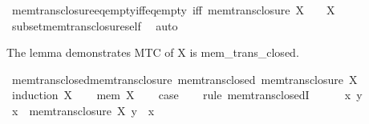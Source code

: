\begin{isabellebody}
\endisatagproof
{\isafoldproof}%
%
\isadelimproof
\isanewline
%
\endisadelimproof
\isanewline
{}\isamarkupfalse%
\ mem{\isacharunderscore}{\kern0pt}trans{\isacharunderscore}{\kern0pt}closure{\isacharunderscore}{\kern0pt}eq{\isacharunderscore}{\kern0pt}empty{\isacharunderscore}{\kern0pt}iff{\isacharunderscore}{\kern0pt}eq{\isacharunderscore}{\kern0pt}empty\ {\isacharbrackleft}{\kern0pt}iff{\isacharbrackright}{\kern0pt}{\isacharcolon}{\kern0pt}\ {\isachardoublequoteopen}mem{\isacharunderscore}{\kern0pt}trans{\isacharunderscore}{\kern0pt}closure\ X\ {\isacharequal}{\kern0pt}\ {\isacharbraceleft}{\kern0pt}{\isacharbraceright}{\kern0pt}\ {\isasymlongleftrightarrow}\ X\ {\isacharequal}{\kern0pt}\ {\isacharbraceleft}{\kern0pt}{\isacharbraceright}{\kern0pt}{\isachardoublequoteclose}\isanewline
%
\isadelimproof
\ \ %
\endisadelimproof
%
\isatagproof
{}\isamarkupfalse%
\ subset{\isacharunderscore}{\kern0pt}mem{\isacharunderscore}{\kern0pt}trans{\isacharunderscore}{\kern0pt}closure{\isacharunderscore}{\kern0pt}self\ \isamarkupfalse%
\ auto%
\endisatagproof
{\isafoldproof}%
%
\isadelimproof
%
\endisadelimproof
%
\begin{isamarkuptext}%
The lemma demonstrates MTC of X is mem\_trans\_closed.%
\end{isamarkuptext}\isamarkuptrue%
\isamarkupfalse%
\ mem{\isacharunderscore}{\kern0pt}trans{\isacharunderscore}{\kern0pt}closed{\isacharunderscore}{\kern0pt}mem{\isacharunderscore}{\kern0pt}trans{\isacharunderscore}{\kern0pt}closure{\isacharcolon}{\kern0pt}\ {\isachardoublequoteopen}mem{\isacharunderscore}{\kern0pt}trans{\isacharunderscore}{\kern0pt}closed\ {\isacharparenleft}{\kern0pt}mem{\isacharunderscore}{\kern0pt}trans{\isacharunderscore}{\kern0pt}closure\ X{\isacharparenright}{\kern0pt}{\isachardoublequoteclose}\isanewline
%
\isadelimproof
%
\endisadelimproof
%
\isatagproof
{}\isamarkupfalse%
\ {\isacharparenleft}{\kern0pt}induction\ X{\isacharparenright}{\kern0pt}\isanewline
\ \ \isamarkupfalse%
\ {\isacharparenleft}{\kern0pt}mem\ X{\isacharparenright}{\kern0pt}\isanewline
\ \ \isamarkupfalse%
\ {\isacharquery}{\kern0pt}case\isanewline
\ \ \isamarkupfalse%
\ {\isacharparenleft}{\kern0pt}rule\ mem{\isacharunderscore}{\kern0pt}trans{\isacharunderscore}{\kern0pt}closedI{\isacharprime}{\kern0pt}{\isacharparenright}{\kern0pt}\isanewline
\ \ \ \ \isamarkupfalse%
\ x\ y\ \isamarkupfalse%
\ {\isachardoublequoteopen}x\ {\isasymin}\ mem{\isacharunderscore}{\kern0pt}trans{\isacharunderscore}{\kern0pt}closure\ X{\isachardoublequoteclose}\ {\isachardoublequoteopen}y\ {\isasymin}\ x{\isachardoublequoteclose}\isanewline

\end{isabellebody}
